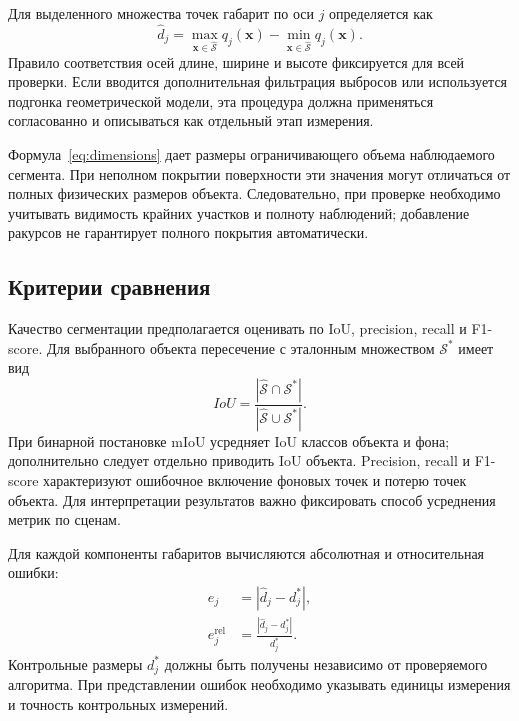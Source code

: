 \documentclass{misisarticle}
\begin{document}
Для выделенного множества точек габарит по оси $j$ определяется как
\begin{equation}
    \widehat{d}_j=
    \max_{\mathbf{x}\in\widehat{\mathcal{S}}}q_j(\mathbf{x})-
    \min_{\mathbf{x}\in\widehat{\mathcal{S}}}q_j(\mathbf{x}).
    \label{eq:dimensions}
\end{equation}
Правило соответствия осей длине, ширине и высоте фиксируется для всей проверки. Если вводится дополнительная фильтрация выбросов или используется подгонка геометрической модели, эта процедура должна применяться согласованно и описываться как отдельный этап измерения.

Формула~\eqref{eq:dimensions} дает размеры ограничивающего объема наблюдаемого сегмента. При неполном покрытии поверхности эти значения могут отличаться от полных физических размеров объекта. Следовательно, при проверке необходимо учитывать видимость крайних участков и полноту наблюдений; добавление ракурсов не гарантирует полного покрытия автоматически.

\subsection{Критерии сравнения}

Качество сегментации предполагается оценивать по IoU, precision, recall и F1-score. Для выбранного объекта пересечение с эталонным множеством $\mathcal{S}^*$ имеет вид
\begin{equation}
    IoU=\frac{|\widehat{\mathcal{S}}\cap\mathcal{S}^*|}
                  {|\widehat{\mathcal{S}}\cup\mathcal{S}^*|}.
\end{equation}
При бинарной постановке mIoU усредняет IoU классов объекта и фона; дополнительно следует отдельно приводить IoU объекта. Precision, recall и F1-score характеризуют ошибочное включение фоновых точек и потерю точек объекта. Для интерпретации результатов важно фиксировать способ усреднения метрик по сценам.

Для каждой компоненты габаритов вычисляются абсолютная и относительная ошибки:
\begin{equation}
\begin{aligned}
    e_j&=|\widehat{d}_j-d_j^*|,\\
    e_j^{\mathrm{rel}}&=\frac{|\widehat{d}_j-d_j^*|}{d_j^*}.
\end{aligned}
\end{equation}
Контрольные размеры $d_j^*$ должны быть получены независимо от проверяемого алгоритма. При представлении ошибок необходимо указывать единицы измерения и точность контрольных измерений.
\end{document}
